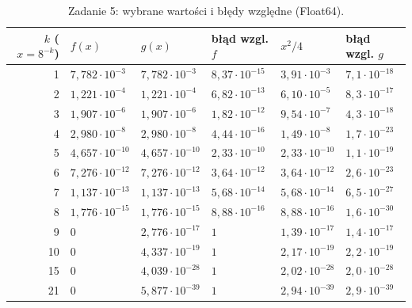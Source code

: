 \documentclass[11pt,a4paper]{article}
\begin{document}
\begin{table}[h]
\centering\footnotesize\setlength{\tabcolsep}{5pt}
\begin{tabular}{@{}rlllll@{}}
\toprule
$k$ ($x=8^{-k}$) & $f(x)$ & $g(x)$ & błąd wzgl. $f$ & $x^2/4$ & błąd wzgl. $g$ \\
\midrule
1 & $7{,}782\cdot10^{-3}$ & $7{,}782\cdot10^{-3}$ & $8{,}37\cdot10^{-15}$ & $3{,}91\cdot10^{-3}$ & $7{,}1\cdot10^{-18}$ \\
2 & $1{,}221\cdot10^{-4}$ & $1{,}221\cdot10^{-4}$ & $6{,}82\cdot10^{-13}$ & $6{,}10\cdot10^{-5}$ & $8{,}3\cdot10^{-17}$ \\
3 & $1{,}907\cdot10^{-6}$ & $1{,}907\cdot10^{-6}$ & $1{,}82\cdot10^{-12}$ & $9{,}54\cdot10^{-7}$ & $4{,}3\cdot10^{-18}$ \\
4 & $2{,}980\cdot10^{-8}$ & $2{,}980\cdot10^{-8}$ & $4{,}44\cdot10^{-16}$ & $1{,}49\cdot10^{-8}$ & $1{,}7\cdot10^{-23}$ \\
5 & $4{,}657\cdot10^{-10}$ & $4{,}657\cdot10^{-10}$ & $2{,}33\cdot10^{-10}$ & $2{,}33\cdot10^{-10}$ & $1{,}1\cdot10^{-19}$ \\
6 & $7{,}276\cdot10^{-12}$ & $7{,}276\cdot10^{-12}$ & $3{,}64\cdot10^{-12}$ & $3{,}64\cdot10^{-12}$ & $2{,}6\cdot10^{-23}$ \\
7 & $1{,}137\cdot10^{-13}$ & $1{,}137\cdot10^{-13}$ & $5{,}68\cdot10^{-14}$ & $5{,}68\cdot10^{-14}$ & $6{,}5\cdot10^{-27}$ \\
8 & $1{,}776\cdot10^{-15}$ & $1{,}776\cdot10^{-15}$ & $8{,}88\cdot10^{-16}$ & $8{,}88\cdot10^{-16}$ & $1{,}6\cdot10^{-30}$ \\
9 & $0$ & $2{,}776\cdot10^{-17}$ & $1$ & $1{,}39\cdot10^{-17}$ & $1{,}4\cdot10^{-17}$ \\
10 & $0$ & $4{,}337\cdot10^{-19}$ & $1$ & $2{,}17\cdot10^{-19}$ & $2{,}2\cdot10^{-19}$ \\
15 & $0$ & $4{,}039\cdot10^{-28}$ & $1$ & $2{,}02\cdot10^{-28}$ & $2{,}0\cdot10^{-28}$ \\
21 & $0$ & $5{,}877\cdot10^{-39}$ & $1$ & $2{,}94\cdot10^{-39}$ & $2{,}9\cdot10^{-39}$ \\
\bottomrule
\end{tabular}
\caption{Zadanie 5: wybrane wartości i błędy względne (Float64).}
\end{table}
\end{document}
